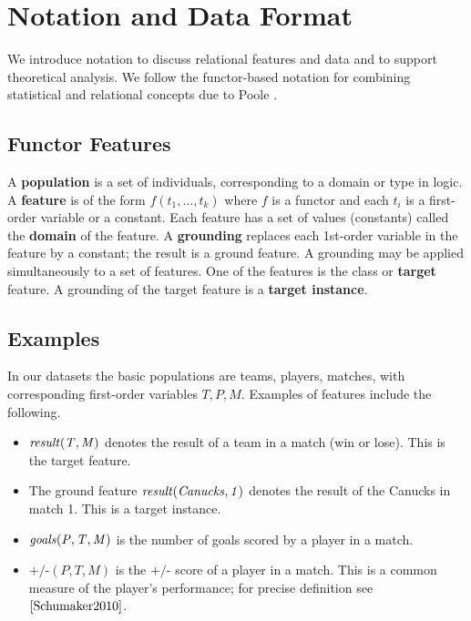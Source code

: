 \documentclass[conference]{IEEEtran}
\newcommand{\team}{T}
\newcommand{\player}{P}
\newcommand{\match}{M}
\newcommand{\plusminus}{\mbox{+/-}}
\begin{document}
\section{Notation and Data Format} We introduce notation to discuss relational features and data and to support theoretical analysis. We follow the functor-based notation for combining statistical and relational concepts due to Poole \cite{Poole2003}.

\subsection{Functor Features}
A \textbf{population} is a set of individuals, corresponding to a domain or type in logic. A \textbf{feature} is of the form $f(t_{1},\ldots,t_{k})$ where $f$ is a functor %
 and each $t_{i}$ is a first-order variable or a constant. Each feature has a set of values (constants) called the \textbf{domain} of the feature.
A \textbf{grounding} replaces each 1st-order variable in the feature by a constant; the result is a ground feature. A grounding may be applied simultaneously to a set of features. One of the features is the class or \textbf{target} feature. A grounding of the target feature is a \textbf{target instance}.

\subsection{Examples} In our datasets the basic populations are teams, players, matches, with corresponding first-order variables $\team, \player, \match$. Examples of features include the following.

\begin{itemize}
\item $\it{result}(\team,\match)$ denotes the result of a team in a match (win or lose). This is the target feature.
\item The ground feature $\it{result}(Canucks,1)$ denotes the result of the Canucks in match 1. This is a target instance.
\item $\it{goals}(\player,\team,\match)$ is the number of goals scored by a player in a match.
\item $\plusminus(\player,\team,\match)$ is the $\plusminus$ score of a player in a match. This is a common measure of the player's performance; for precise definition see $\cite{Schumaker2010}$.
\end{itemize}
\end{document}
